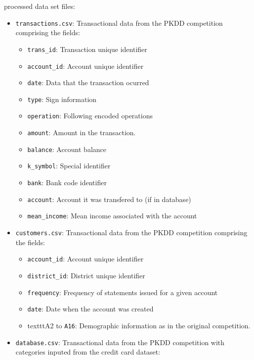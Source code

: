 \documentclass[]{article}
\begin{document}
processed data set files: 
\begin{itemize}
    \item \texttt{transactions.csv}: Transactional
data from the PKDD competition comprising the fields:
    \begin{itemize}
        \tightlist
        \item \texttt{trans\_id}: Transaction unique identifier
        \item \texttt{account\_id}: Account unique identifier
        \item \texttt{date}: Data
that the transaction ocurred
        \item \texttt{type}: Sign information
        \item \texttt{operation}: Following encoded operations 
        \item \texttt{amount}:
Amount in the transaction. 
        \item \texttt{balance}: Account balance
        \item \texttt{k\_symbol}: Special identifier
        \item \texttt{bank}: Bank code
identifier
        \item \texttt{account}: Account it was transfered to (if in
database)
        \item \texttt{mean\_income}: Mean income associated with the
account
    \end{itemize}
    \item \texttt{customers.csv}: Transactional data from the PKDD
competition comprising the fields:
    \begin{itemize}
        \tightlist
        \item \texttt{account\_id}: Account
unique identifier
        \item \texttt{district\_id}: District unique identifier
        \item \texttt{frequency}: Frequency of statements issued for a given account
        \item \texttt{date}: Date when the account was created
        \item texttt{A2} to
\texttt{A16}: Demographic information as in the original competition.
    \end{itemize}
\item
  \texttt{database.csv}: Transactional data from the PKDD competition
  with categories inputed from the credit card dataset:


\end{itemize}
\end{document}
